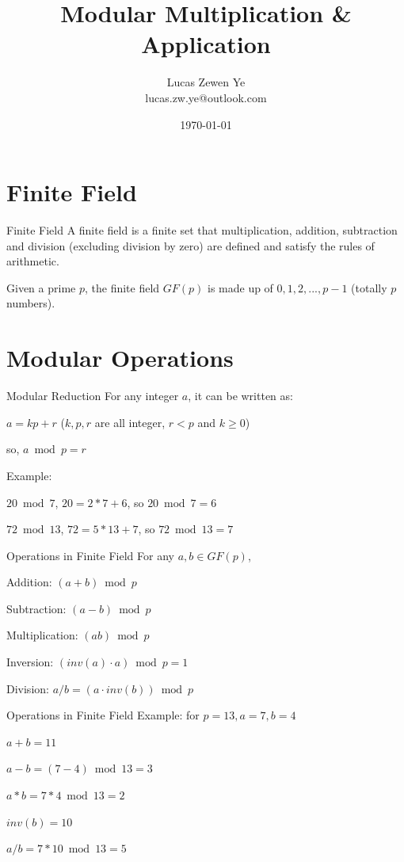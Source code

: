 \documentclass{beamer}
\title{Modular Multiplication \& Application}
\author{Lucas Zewen Ye \\ lucas.zw.ye@outlook.com }
\date{\today}
\begin{document}
\maketitle

\section{Finite Field}
\begin{frame}{Finite Field}
	A finite field is a finite set that multiplication, addition, subtraction and division (excluding division by zero) are defined and satisfy the rules of arithmetic.

	Given a \alert{prime} $p$, the finite field $GF(p)$ is made up of $0, 1, 2, ..., p-1$ (totally $p$ numbers).

\end{frame}

\section{Modular Operations}
\begin{frame}{Modular Reduction}
	For any integer $a$, it can be written as:

	$a = kp + r$ ($k,p,r$ are all integer, $r < p$ and $k \geq 0$)

	so, $a \bmod p = r$

	\hspace*{\fill}

	Example:

	$20 \bmod 7$, $20 = 2 * 7 + 6$, so $20 \bmod 7 = 6$

	$72 \bmod 13$, $72 = 5 * 13 + 7$, so $72 \bmod 13 = 7$

\end{frame}

\begin{frame}{Operations in Finite Field}
	For any $a, b \in GF(p)$,

	Addition: $(a + b) \bmod p$

	Subtraction: $(a - b) \bmod p$

	Multiplication: $(a  b) \bmod p$

	Inversion: $(inv(a) \cdot a) \bmod p = 1$

	Division: $a / b = (a \cdot inv(b)) \bmod p$
\end{frame}

\begin{frame}{Operations in Finite Field}
	Example: for $p=13, a=7, b=4$

	$a + b = 11$

	$a - b = (7 - 4) \bmod 13 = 3$

	$a * b = 7 * 4 \bmod 13 = 2$

	$inv(b) = 10$

	$a / b = 7 * 10 \bmod 13 = 5$
\end{frame}
\end{document}
